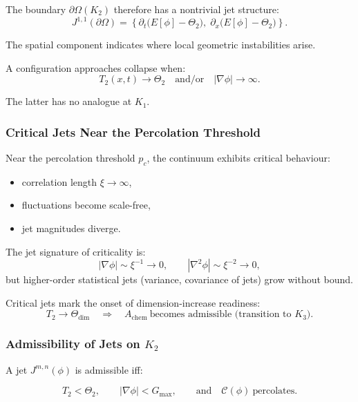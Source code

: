 The boundary $\partial\Omega(K_2)$ therefore has a nontrivial jet
structure:
\[
J^{1,1}(\partial\Omega) =
\left\{
\partial_t\bigl(E[\phi]-\Theta_2\bigr),\;
\partial_x\bigl(E[\phi]-\Theta_2\bigr)
\right\}.
\]

The spatial component indicates where local geometric instabilities
arise.

A configuration approaches collapse when:
\[
T_2(x,t)\to \Theta_2
\quad\text{and/or}\quad
|\nabla\phi|\to\infty.
\]

The latter has no analogue at $K_1$.



\subsubsection{Critical Jets Near the Percolation Threshold}

Near the percolation threshold $p_c$, the continuum exhibits critical
behaviour:

\begin{itemize}
    \item correlation length $\xi\to\infty$,
    \item fluctuations become scale-free,
    \item jet magnitudes diverge.
\end{itemize}

The jet signature of criticality is:
\[
|\nabla\phi| \sim \xi^{-1} \to 0,
\qquad
|\nabla^2\phi| \sim \xi^{-2} \to 0,
\]
but higher-order statistical jets (variance, covariance of jets) grow
without bound.

Critical jets mark the onset of dimension-increase readiness:
\[
T_2 \to \Theta_{\mathrm{dim}}
\quad\Longrightarrow\quad
A_{\mathrm{chem}}\ \text{becomes admissible (transition to $K_3$)}.
\]



\subsubsection{Admissibility of Jets on \texorpdfstring{$K_2$}{K_2}}

A jet $J^{m,n}(\phi)$ is admissible iff:

\[
T_2 < \Theta_2,
\qquad
|\nabla\phi| < G_{\max},
\qquad
\text{and}\quad
\mathcal{C}(\phi)\ \text{percolates}.
\]

